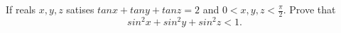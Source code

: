 If reals $x, y, z $ satises $tan x + tan y + tan z = 2$ and $0 < x, y,z < \frac{\pi}{2}.$ Prove that
$$sin^2 x + sin^2 y + sin^2 z < 1.$$
